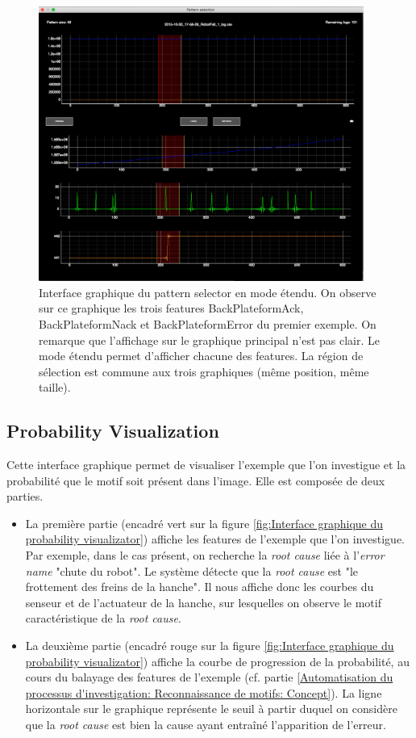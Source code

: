\begin{figure}[H]
	\centering\includegraphics[height=9cm]{images/pattern_selector_ext.png}
	\caption[Interface graphique du pattern selector en mode étendu]{Interface graphique du pattern selector en mode étendu. On observe sur ce graphique les trois features BackPlateformAck, BackPlateformNack et BackPlateformError du premier exemple. On remarque que l'affichage sur le graphique principal n'est pas clair. Le mode étendu permet d'afficher chacune des features. La région de sélection est commune aux trois graphiques (même position, même taille).}
	\label{fig:Interface graphique du pattern selector en mode étendu}
\end{figure}

\subsection{Probability Visualization}
\label{Industrialisation du produit: Outils graphiques: Probability Visualization}
Cette interface graphique permet de visualiser l'exemple que l'on investigue et la probabilité que le motif soit présent dans l'image. Elle est composée de deux parties. 
\begin{itemize}
	\item La première partie (encadré vert sur la figure \ref{fig:Interface graphique du probability visualizator}) affiche les features de l'exemple que l'on investigue. Par exemple, dans le cas présent, on recherche la \emph{root cause} liée à l'\emph{error name} "chute du robot". Le système détecte que la \emph{root cause} est "le frottement des freins de la hanche". Il nous affiche donc les courbes du senseur et de l'actuateur de la hanche, sur lesquelles on observe le motif caractéristique de la \emph{root cause}. 
	\item La deuxième partie (encadré rouge sur la figure \ref{fig:Interface graphique du probability visualizator}) affiche la courbe de progression de la probabilité, au cours du balayage des features de l'exemple (cf. partie \ref{Automatisation du processus d'investigation: Reconnaissance de motifs: Concept}). La ligne horizontale sur le graphique représente le seuil à partir duquel on considère que la \emph{root cause} est bien la cause ayant entraîné l'apparition de l'erreur.
\end{itemize}

